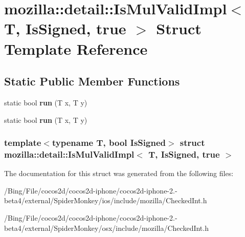 \hypertarget{structmozilla_1_1detail_1_1_is_mul_valid_impl_3_01_t_00_01_is_signed_00_01true_01_4}{\section{mozilla\-:\-:detail\-:\-:Is\-Mul\-Valid\-Impl$<$ T, Is\-Signed, true $>$ Struct Template Reference}
\label{structmozilla_1_1detail_1_1_is_mul_valid_impl_3_01_t_00_01_is_signed_00_01true_01_4}
}
\subsection*{Static Public Member Functions}
\begin{DoxyCompactItemize}
\item 
\hypertarget{structmozilla_1_1detail_1_1_is_mul_valid_impl_3_01_t_00_01_is_signed_00_01true_01_4_abadb0544f586af0f00ae2c07e7caadc0}{static bool {\bfseries run} (T x, T y)}\label{structmozilla_1_1detail_1_1_is_mul_valid_impl_3_01_t_00_01_is_signed_00_01true_01_4_abadb0544f586af0f00ae2c07e7caadc0}

\item 
\hypertarget{structmozilla_1_1detail_1_1_is_mul_valid_impl_3_01_t_00_01_is_signed_00_01true_01_4_abadb0544f586af0f00ae2c07e7caadc0}{static bool {\bfseries run} (T x, T y)}\label{structmozilla_1_1detail_1_1_is_mul_valid_impl_3_01_t_00_01_is_signed_00_01true_01_4_abadb0544f586af0f00ae2c07e7caadc0}

\end{DoxyCompactItemize}
\subsubsection*{template$<$typename T, bool Is\-Signed$>$ struct mozilla\-::detail\-::\-Is\-Mul\-Valid\-Impl$<$ T, Is\-Signed, true $>$}



The documentation for this struct was generated from the following files\-:\begin{DoxyCompactItemize}
\item 
/\-Bing/\-File/cocos2d/cocos2d-\/iphone/cocos2d-\/iphone-\/2.-\/beta4/external/\-Spider\-Monkey/ios/include/mozilla/Checked\-Int.\-h\item 
/\-Bing/\-File/cocos2d/cocos2d-\/iphone/cocos2d-\/iphone-\/2.-\/beta4/external/\-Spider\-Monkey/osx/include/mozilla/Checked\-Int.\-h\end{DoxyCompactItemize}
